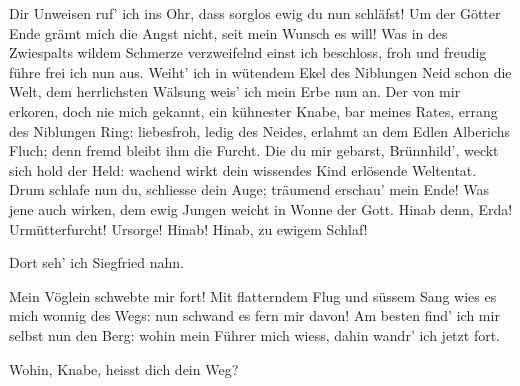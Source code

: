\begin{drama}
Dir Unweisen
ruf' ich ins Ohr,
dass sorglos ewig du nun schläfst!
Um der Götter Ende
grämt mich die Angst nicht,
seit mein Wunsch es will!
Was in des Zwiespalts wildem Schmerze
verzweifelnd einst ich beschloss,
froh und freudig
führe frei ich nun aus.
Weiht' ich in wütendem Ekel
des Niblungen Neid schon die Welt,
dem herrlichsten Wälsung
weis' ich mein Erbe nun an.
Der von mir erkoren,
doch nie mich gekannt,
ein kühnester Knabe,
bar meines Rates,
errang des Niblungen Ring:
liebesfroh,
ledig des Neides,
erlahmt an dem Edlen
Alberichs Fluch;
denn fremd bleibt ihm die Furcht.
Die du mir gebarst,
Brünnhild',
weckt sich hold der Held:
wachend wirkt
dein wissendes Kind
erlösende Weltentat.
Drum schlafe nun du,
schliesse dein Auge;
träumend erschau' mein Ende!
Was jene auch wirken,
dem ewig Jungen
weicht in Wonne der Gott.
Hinab denn, Erda!
Urmütterfurcht!
Ursorge!
Hinab! Hinab,
zu ewigem Schlaf!


\scene


\Wandererspeaks

Dort seh' ich Siegfried nahn.


\Siegfriedspeaks


Mein Vöglein schwebte mir fort!
Mit flatterndem Flug
und süssem Sang
wies es mich wonnig des Wegs:
nun schwand es fern mir davon!
Am besten find' ich mir
selbst nun den Berg:
wohin mein Führer mich wiess,
dahin wandr' ich jetzt fort.


\Wandererspeaks


Wohin, Knabe,
heisst dich dein Weg?

\Siegfriedspeaks


\end{drama}
